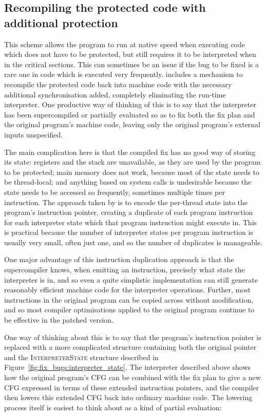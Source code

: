 \subsection{Recompiling the protected code with additional protection}

This scheme allows the program to run at native speed when executing
code which does not have to be protected, but still requires it to be
interpreted when in the critical sections.  This can sometimes be an
issue if the bug to be fixed is a rare one in code which is executed
very frequently.  {\Implementation} includes a mechanism to recompile
the protected code back into machine code with the necessary
additional synchronisation added, completely eliminating the run-time
interpreter.  One productive way of thinking of this is to say that
the interpreter has been supercompiled\needCite{} or partially
evaluated\needCite{} so as to fix both the fix plan and the original
program's machine code, leaving only the original program's external
inputs unspecified.

The main complication here is that the compiled fix has no good way of
storing its state: registers and the stack are unavailable, as they
are used by the program to be protected; main memory does not work,
because most of the state needs to be thread-local; and anything based
on system calls is undesirable because the state needs to be accessed
so frequently, sometimes multiple times per instruction.  The approach
taken by {\implementation} is to encode the per-thread state into the
program's instruction pointer, creating a duplicate of each program
instruction for each interpreter state which that program instruction
might execute in.  This is practical because the number of interpreter
states per program instruction is usually very small, often just one,
and so the number of duplicates is manageable.

One major advantage of this instruction duplication approach is that
the supercompiler knows, when emitting an instruction, precisely what
state the interpreter is in, and so even a quite simplistic
implementation can still generate reasonably efficient machine code
for the interpreter operations.  Further, most instructions in the
original program can be copied across without modification, and so
most compiler optimisations applied to the original program continue
to be effective in the patched version.

One way of thinking about this is to say that the program's
instruction pointer is replaced with a more complicated structure
containing both the original pointer and the \textsc{InterpreterState}
structure described in Figure~\ref{fig:fix_bugs:interpreter_state}.
The interpreter described above shows how the original program's CFG
can be combined with the fix plan to give a new CFG expressed in terms
of these extended instruction pointers, and the compiler then lowers
this extended CFG back into ordinary machine code.  The lowering
process itself is easiest to think about as a kind of partial
evaluation:

